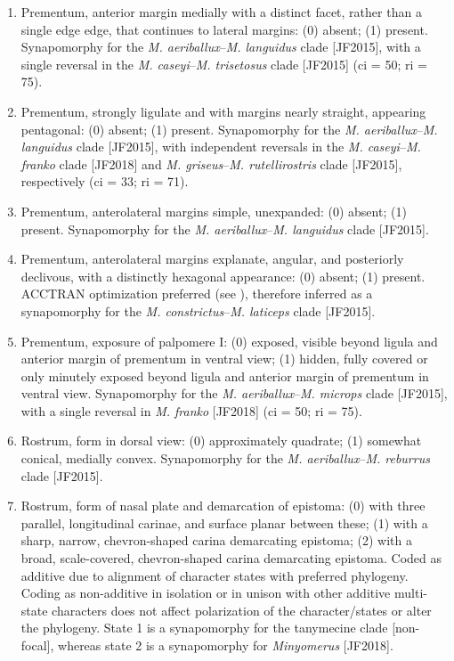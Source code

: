 \documentclass[fleqn,10pt,lineno]{wlpeerj} %
\begin{document}
\begin{enumerate}
	 	\item Prementum, anterior margin medially with a distinct facet, rather than a single edge edge, that continues to lateral margins: (0) absent; (1) present. Synapomorphy for the \textit{M. aeriballux}--\textit{M. languidus} clade [JF2015], with a single reversal in the  \textit{M. caseyi}--\textit{M. trisetosus} clade [JF2015] (ci = 50; ri = 75).
	 	
	 	\item Prementum, strongly ligulate and with margins nearly straight, appearing pentagonal: (0) absent; (1) present. Synapomorphy for the \textit{M. aeriballux}--\textit{M. languidus} clade [JF2015], with independent reversals in the \textit{M. caseyi}--\textit{M. franko} clade [JF2018] and \textit{M. griseus}--\textit{M. rutellirostris} clade [JF2015], respectively (ci = 33; ri = 71).
	 	
	 	\item Prementum, anterolateral margins simple, unexpanded: (0) absent; (1) present. Synapomorphy for the \textit{M. aeriballux}--\textit{M. languidus} clade [JF2015].
	 	
	 	\item Prementum, anterolateral margins explanate, angular, and posteriorly declivous, with a distinctly hexagonal appearance: (0) absent; (1) present. ACCTRAN optimization preferred (see \citealt{agnarsson2008}), therefore inferred as a synapomorphy for the \textit{M. constrictus}--\textit{M. laticeps} clade [JF2015].
	 	
	 	\item Prementum, exposure of palpomere I: (0) exposed, visible beyond ligula and anterior margin of prementum in ventral view; (1) hidden, fully covered or only minutely exposed beyond ligula and anterior margin of prementum in ventral view. Synapomorphy for the \textit{M. aeriballux}--\textit{M. microps} clade [JF2015], with a single reversal in \textit{M. franko} [JF2018] (ci = 50; ri = 75).
	 	
	 	\item Rostrum, form in dorsal view: (0) approximately quadrate; (1) somewhat conical, medially convex. Synapomorphy for the \textit{M. aeriballux}--\textit{M. reburrus} clade [JF2015].
	 	
	 	\item Rostrum, form of nasal plate and demarcation of epistoma: (0) with three parallel, longitudinal carinae, and surface planar between these; (1) with a sharp, narrow, chevron-shaped carina demarcating epistoma; (2) with a broad, scale-covered, chevron-shaped carina demarcating epistoma. Coded as additive due to alignment of character states with preferred phylogeny. Coding as non-additive in isolation or in unison with other additive multi-state characters does not affect polarization of the character/states or alter the phylogeny. State 1 is a synapomorphy for the tanymecine clade [non-focal], whereas state 2 is a synapomorphy for \textit{Minyomerus} [JF2018].
	 	

\end{enumerate}
\end{document}

